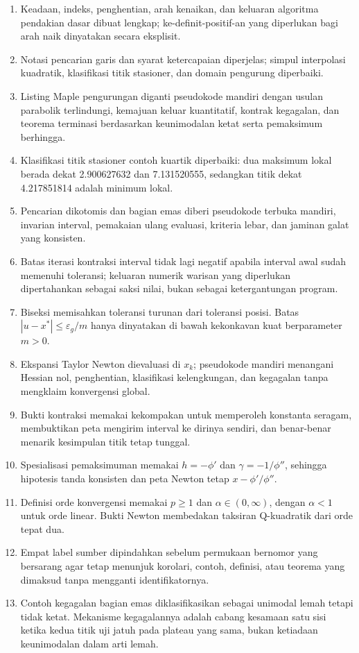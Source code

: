 \documentclass[a4paper,openany,leqno,fleqn,12pt]{amsbook}
\numberwithin{equation}{chapter}
\numberwithin{figure}{chapter}
\theoremstyle{definition}
\theoremstyle{remark}
\begin{document}
\begin{enumerate}
  \item Keadaan, indeks, penghentian, arah kenaikan, dan keluaran algoritma
  pendakian dasar dibuat lengkap; ke-definit-positif-an yang diperlukan bagi
  arah naik dinyatakan secara eksplisit.
  \item Notasi pencarian garis dan syarat ketercapaian diperjelas; simpul
  interpolasi kuadratik, klasifikasi titik stasioner, dan domain pengurung
  diperbaiki.
  \item Listing Maple pengurungan diganti pseudokode mandiri dengan usulan
  parabolik terlindungi, kemajuan keluar kuantitatif, kontrak kegagalan, dan
  teorema terminasi berdasarkan keunimodalan ketat serta pemaksimum berhingga.
  \item Klasifikasi titik stasioner contoh kuartik diperbaiki: dua maksimum
  lokal berada dekat 2.900627632 dan 7.131520555, sedangkan titik dekat
  4.217851814 adalah minimum lokal.
  \item Pencarian dikotomis dan bagian emas diberi pseudokode terbuka mandiri,
  invarian interval, pemakaian ulang evaluasi, kriteria lebar, dan jaminan
  galat yang konsisten.
  \item Batas iterasi kontraksi interval tidak lagi negatif apabila interval
  awal sudah memenuhi toleransi; keluaran numerik warisan yang diperlukan
  dipertahankan sebagai saksi nilai, bukan sebagai ketergantungan program.
  \item Biseksi memisahkan toleransi turunan dari toleransi posisi. Batas
  $|u-x^*|\leq\varepsilon_g/m$ hanya dinyatakan di bawah kekonkavan kuat
  berparameter $m>0$.
  \item Ekspansi Taylor Newton dievaluasi di $x_k$; pseudokode mandiri
  menangani Hessian nol, penghentian, klasifikasi kelengkungan, dan kegagalan
  tanpa mengklaim konvergensi global.
  \item Bukti kontraksi memakai kekompakan untuk memperoleh konstanta seragam,
  membuktikan peta mengirim interval ke dirinya sendiri, dan benar-benar
  menarik kesimpulan titik tetap tunggal.
  \item Spesialisasi pemaksimuman memakai $h=-\phi'$ dan
  $\gamma=-1/\phi''$, sehingga hipotesis tanda konsisten dan peta Newton tetap
  $x-\phi'/\phi''$.
  \item Definisi orde konvergensi memakai $p\geq1$ dan
  $\alpha\in(0,\infty)$, dengan $\alpha<1$ untuk orde linear. Bukti Newton
  membedakan taksiran Q-kuadratik dari orde tepat dua.
  \item Empat label sumber dipindahkan sebelum permukaan bernomor yang
  bersarang agar tetap menunjuk korolari, contoh, definisi, atau teorema yang
  dimaksud tanpa mengganti identifikatornya.
  \item Contoh kegagalan bagian emas diklasifikasikan sebagai unimodal lemah
  tetapi tidak ketat. Mekanisme kegagalannya adalah cabang kesamaan satu sisi
  ketika kedua titik uji jatuh pada plateau yang sama, bukan ketiadaan
  keunimodalan dalam arti lemah.
\end{enumerate}
\end{document}
